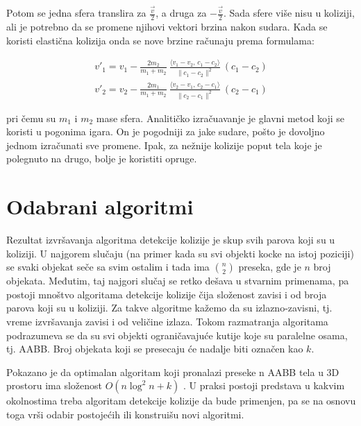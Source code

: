 \documentclass[12pt,oneside]{memoir}
\begin{document}
Potom se jedna sfera translira za $ \frac{ \vec{v} }{ 2 }$, a druga za $ -\frac{ \vec{v} }{ 2 }$.
Sada sfere više nisu u koliziji, ali je potrebno da se promene njihovi vektori brzina nakon sudara.
Kada se koristi elastična kolizija onda se nove brzine računaju prema formulama:


\begin{equation}
	\label{eq:razresenje}
	\begin{split}
		{v}'_1= {v}_1-\frac{2 m_2}{m_1+m_2} \ \frac{\langle  {v}_1- {v}_2,\, {c}_1- {c}_2\rangle}{\| {c}_1- {c}_2\|^2} \ ( {c}_1- {c}_2) \\
		{v}'_2= {v}_2-\frac{2 m_1}{m_1+m_2} \ \frac{\langle  {v}_2- {v}_1,\, {c}_2- {c}_1\rangle}{\| {c}_2- {c}_1\|^2} \ ( {c}_2- {c}_1) 
	\end{split}
\end{equation}


pri čemu su $m_1$ i $m_2$ mase sfera.
Analitičko izračuavanje je glavni metod koji se koristi u pogonima igara.
On je pogodniji za jake sudare, pošto je dovoljno jednom izračunati sve promene.
Ipak, za nežnije kolizije poput tela koje je polegnuto na drugo, bolje je koristiti opruge.

\chapter{Odabrani algoritmi}
\label{sec:algoritmi}

Rezultat izvršavanja algoritma detekcije kolizije je skup svih parova koji su u koliziji.
U najgorem slučaju (na primer kada su svi objekti kocke na istoj poziciji) se svaki objekat
seče sa svim ostalim i tada ima $ {n\choose 2}  $ preseka, gde je $n$ broj objekata. Međutim, taj najgori slučaj se retko dešava
u stvarnim primenama, pa postoji mnoštvo algoritama detekcije kolizije čija složenost zavisi i od broja
parova koji su u koliziji. Za takve algoritme kažemo da su izlazno-zavisni, tj.
vreme izvršavanja zavisi i od veličine izlaza. Tokom razmatranja algoritama podrazumeva se da su svi
objekti ograničavajuće kutije koje su paralelne osama, tj. AABB.
Broj objekata koji se presecaju će nadalje biti označen kao $k$. 

Pokazano je da optimalan algoritam koji pronalazi preseke n AABB tela u 3D prostoru ima složenost 
$O(n \log^2 n + k)$ \cite{glavna1}. 
U praksi postoji predstava u kakvim okolnostima treba algoritam detekcije kolizije da bude primenjen, pa 
se na osnovu toga vrši odabir postojećih ili konstruišu novi algoritmi.
\end{document}

